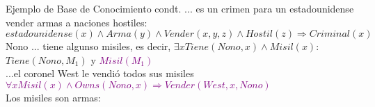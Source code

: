 \begin{frame}{Ejemplo de Base de Conocimiento condt.}
... es un crimen para un estadounidense vender armas a naciones hostiles:
\\\textcolor{DarkPurple}{$estadounidense(x)\wedge Arma(y) \wedge Vender(x,y,z)\wedge Hostil(z)\Rightarrow Criminal(x)$}
\\Nono ... tiene algunso misiles, es decir, $\exists x Tiene(Nono,x) \wedge Misil(x) :$ \textcolor{DarkPurple}{$Tiene(Nono,M_1)$} y \textcolor{purple}{$Misil(M_1)$}
\\...el coronel West le vendió todos sus misiles   
\textcolor{purple}{$\forall x Misil(x) \land Owns(Nono,x) \Rightarrow Vender(West,x,Nono)$} 
\\Los misiles son armas:  
\end{frame}